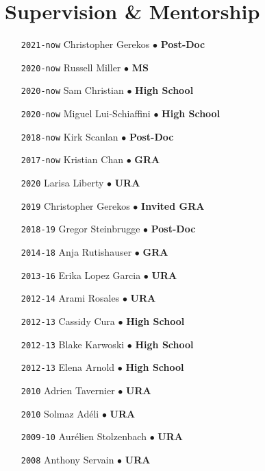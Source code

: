 \section*{Supervision \& Mentorship}

\begin{itemize}[leftmargin=5.8em, labelsep=1.5em]
\setlength\itemsep{-.5em}
    \item[\texttt{2021-now}] Christopher Gerekos $\bullet$ \textbf{Post-Doc}
    \item[\texttt{2020-now}] Russell Miller $\bullet$ \textbf{MS}
    \item[\texttt{2020-now}] Sam Christian $\bullet$ \textbf{High School}
    \item[\texttt{2020-now}] Miguel Lui-Schiaffini $\bullet$ \textbf{High School}
    \item[\texttt{2018-now}] Kirk Scanlan $\bullet$ \textbf{Post-Doc}
    \item[\texttt{2017-now}] Kristian Chan $\bullet$ \textbf{GRA}
    \item[\texttt{2020}] Larisa Liberty $\bullet$ \textbf{URA}
    \item[\texttt{2019}] Christopher Gerekos $\bullet$ \textbf{Invited GRA}
    \item[\texttt{2018-19}] Gregor Steinbrugge $\bullet$ \textbf{Post-Doc}
    \item[\texttt{2014-18}] Anja Rutishauser $\bullet$ \textbf{GRA}
    \item[\texttt{2013-16}] Erika Lopez Garcia $\bullet$ \textbf{URA}
    \item[\texttt{2012-14}] Arami Rosales $\bullet$ \textbf{URA}
    \item[\texttt{2012-13}] Cassidy Cura $\bullet$ \textbf{High School}
    \item[\texttt{2012-13}] Blake Karwoski $\bullet$ \textbf{High School}
    \item[\texttt{2012-13}] Elena Arnold $\bullet$ \textbf{High School}
    \item[\texttt{2010}] Adrien Tavernier $\bullet$ \textbf{URA}
    \item[\texttt{2010}] Solmaz Adéli $\bullet$ \textbf{URA}
    \item[\texttt{2009-10}] Aurélien Stolzenbach $\bullet$ \textbf{URA}
    \item[\texttt{2008}] Anthony Servain $\bullet$ \textbf{URA}
\end{itemize}
